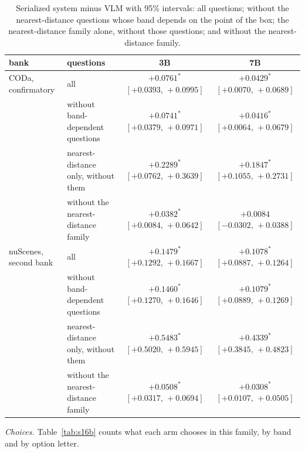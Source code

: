 \documentclass[10pt]{article}
\renewcommand{\thetable}{S\arabic{table}}
\newcommand{\settab}[1]{\setcounter{table}{#1}\addtocounter{table}{-1}\renewcommand{\thetable}{S\arabic{table}}}
\begin{document}
\settab{16}\begin{table}[h]\centering\footnotesize
\caption{Serialized system minus VLM with 95\% intervals: all questions; without the nearest-distance questions whose band depends on the point of the box; the nearest-distance family alone, without those questions; and without the nearest-distance family.}\label{tab:s16}
\begin{tabular}{@{}llcc@{}}
\toprule bank & questions & 3B & 7B \\ \midrule
CODa, confirmatory & all & $+0.0761^{*}$ $[+0.0393,\,+0.0995]$ & $+0.0429^{*}$ $[+0.0070,\,+0.0689]$ \\
 & without band-dependent questions & $+0.0741^{*}$ $[+0.0379,\,+0.0971]$ & $+0.0416^{*}$ $[+0.0064,\,+0.0679]$ \\
 & nearest-distance only, without them & $+0.2289^{*}$ $[+0.0762,\,+0.3639]$ & $+0.1847^{*}$ $[+0.1055,\,+0.2731]$ \\
 & without the nearest-distance family & $+0.0382^{*}$ $[+0.0084,\,+0.0642]$ & $+0.0084$ $[-0.0302,\,+0.0388]$ \\ \midrule
nuScenes, second bank & all & $+0.1479^{*}$ $[+0.1292,\,+0.1667]$ & $+0.1078^{*}$ $[+0.0887,\,+0.1264]$ \\
 & without band-dependent questions & $+0.1460^{*}$ $[+0.1270,\,+0.1646]$ & $+0.1079^{*}$ $[+0.0889,\,+0.1269]$ \\
 & nearest-distance only, without them & $+0.5483^{*}$ $[+0.5020,\,+0.5945]$ & $+0.4339^{*}$ $[+0.3845,\,+0.4823]$ \\
 & without the nearest-distance family & $+0.0508^{*}$ $[+0.0317,\,+0.0694]$ & $+0.0308^{*}$ $[+0.0107,\,+0.0505]$ \\
\bottomrule
\end{tabular}
\end{table}

\emph{Choices.} Table~\ref{tab:s16b} counts what each arm chooses in this family, by band and by option letter.
\end{document}
